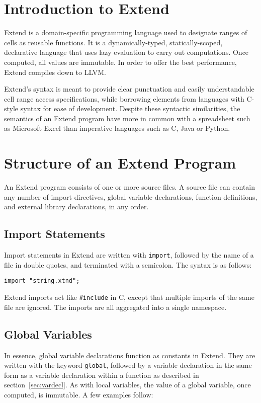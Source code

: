 \section{Introduction to Extend}
	Extend is a domain-specific programming language used to designate ranges of cells as reusable functions. It is a dynamically-typed, statically-scoped, declarative language that uses lazy evaluation to carry out computations. Once computed, all values are immutable. In order to offer the best performance, Extend compiles down to LLVM.

	Extend's syntax is meant to provide clear punctuation and easily understandable cell range access specifications, while borrowing elements from languages with C-style syntax for ease of development. Despite these syntactic similarities, the semantics of an Extend program have more in common with a spreadsheet such as Microsoft Excel than imperative languages such as C, Java or Python.

\section{Structure of an Extend Program}
\label{sec:Grammar}
	An Extend program consists of one or more source files. A source file can contain any number of import directives, global variable declarations, function definitions, and external library declarations, in any order.
	\subsection{Import Statements}
		Import statements in Extend are written with \texttt{import}, followed by the name of a file in double quotes, and terminated with a semicolon. The syntax is as follows:
		\begin{lstlisting}
import "string.xtnd";
		\end{lstlisting}
		Extend imports act like \texttt{\#include} in C, except that multiple imports of the same file are ignored. The imports are all aggregated into a single namespace.
	\subsection{Global Variables}
		In essence, global variable declarations function as constants in Extend. They are written with the keyword \texttt{global}, followed by a variable declaration in the same form as a variable declaration within a function as described in section~\ref{sec:vardecl}. As with local variables, the value of a global variable, once computed, is immutable. A few examples follow:
		
